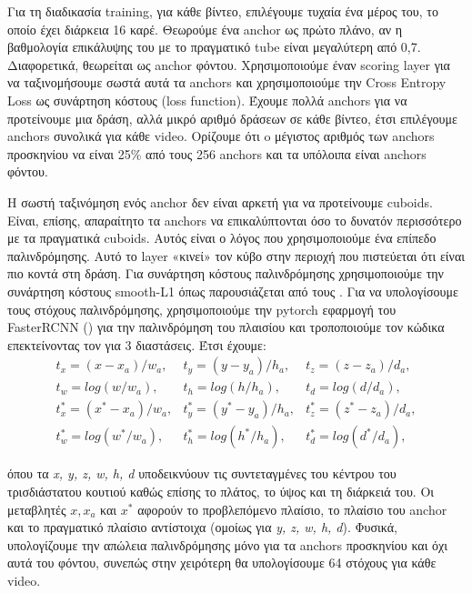 Για τη διαδικασία \en training\gr, για κάθε βίντεο, επιλέγουμε τυχαία ένα μέρος του, το οποίο έχει διάρκεια 16 καρέ. Θεωρούμε ένα \en anchor \gr ως πρώτο πλάνο,
αν η βαθμολογία επικάλυψης του με το πραγματικό
\en tube \gr είναι μεγαλύτερη από 0,7. Διαφορετικά, θεωρείται ως \en anchor  \gr φόντου. Χρησιμοποιούμε έναν \en scoring layer \gr για να ταξινομήσουμε σωστά αυτά τα \en anchors \gr και χρησιμοποιούμε
την \en Cross Entropy Loss \gr ως συνάρτηση κόστους \en (loss function\gr). Έχουμε πολλά \en anchors \gr για να προτείνουμε μια δράση, αλλά μικρό αριθμό δράσεων σε κάθε βίντεο, έτσι επιλέγουμε  anchors \gr συνολικά για κάθε \en video\gr. Ορίζουμε ότι o μέγιστος αριθμός των \en anchors \gr προσκηνίου να είναι 25\% από τους 256 \en anchors \gr και τα υπόλοιπα είναι \en anchors \gr φόντου.  \par
Η σωστή ταξινόμηση ενός \en anchor \gr δεν είναι αρκετή για να προτείνουμε \en cuboids\gr. Είναι, επίσης,  απαραίτητο τα \en anchors \gr να επικαλύπτονται όσο το δυνατόν περισσότερο με τα πραγματικά \en
cuboids\gr.
Αυτός είναι ο λόγος που χρησιμοποιούμε ένα επίπεδο παλινδρόμησης. Αυτό το \en layer \gr «κινεί» τον κύβο στην περιοχή που πιστεύεται ότι είναι πιο κοντά στη δράση.
Για συνάρτηση κόστους παλινδρόμησης χρησιμοποιούμε την συνάρτηση κόστους \en smooth-L1 \gr  όπως παρουσιάζεται από τους \en \cite{DBLP:journals/corr/GirshickDDM13}\gr. Για να υπολογίσουμε τους
 στόχους παλινδρόμησης, χρησιμοποιούμε την \en pytorch \gr εφαρμογή του  \en FasterRCNN (\cite{jjfaster2rcnn}\gr) για την παλινδρόμηση του πλαισίου και 
τροποποιούμε τον κώδικα επεκτείνοντας τον για 3 διαστάσεις. %
Έτσι έχουμε:
\en
\[ \begin{matrix}
    t_x = (x-x_a)/w_a, & t_y = (y-y_a)/h_a, & t_z= (z-z_a)/d_a, \\
    t_w= log(w/w_a), & t_h= log(h/h_a), & t_d = log(d/d_a), \\
    t^*_x = (x^* - x_a)/w_a, & t^*_y = (y^* - y_a)/h_a, & t^*_z = (z^* - z_a)/d_a, \\
    t^*_w = log(w^* /w_a), & t^*_h = log(h^*/h_a), & t^*_d = log(d^*/d_a),
  \end{matrix}
\] \gr

όπου τα \en\textit{x, y, z, w, h, d} \gr υποδεικνύουν τις συντεταγμένες του κέντρου του τρισδιάστατου κουτιού καθώς επίσης το πλάτος, το ύψος και τη διάρκειά του. Οι μεταβλητές
\en $x, x_a $ \gr και \en $ x^*$ \gr αφορούν το προβλεπόμενο πλαίσιο, το πλαίσιο του \en anchor \gr και το πραγματικό πλαίσιο αντίστοιχα (ομοίως για \en \textit{y, z, w, h, d}\gr).
Φυσικά, υπολογίζουμε την απώλεια παλινδρόμησης μόνο για τα \en anchors \gr προσκηνίου και όχι αυτά του φόντου, συνεπώς στην χειρότερη θα υπολογίσουμε 64 στόχους για κάθε \en video.\gr \par

